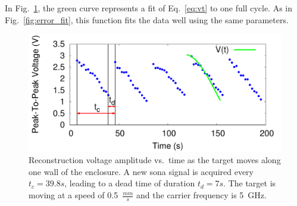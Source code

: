 In Fig.~\ref{fig:moving_recon}, the green curve represents a fit of
Eq.~\ref{eq:vt} to one full cycle. As in Fig.~\ref{fig:error_fit}, this
function fits the data well using the same parameters.



\begin{figure}[t]
\centering
\includegraphics[width=\columnwidth]{figs/moving_recon.pdf}
\caption{Reconstruction voltage amplitude vs.\ time as the target moves along
one wall of the enclosure. A new sona signal is acquired every $t_{c}=39.8s$,
leading to a dead time of duration $t_{d}=7s$. The target is moving at a speed
of 0.5~$\frac{mm}{s}$ and the carrier frequency is 5~GHz.}
\label{fig:moving_recon}
\end{figure}
